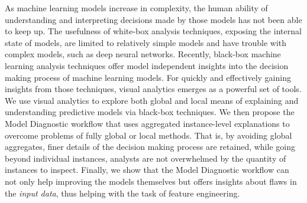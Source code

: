 As machine learning models increase in complexity, the human ability of understanding and interpreting decisions made by those models has not been able to keep up.
The usefulness of white-box analysis techniques, exposing the internal state of models, are limited to relatively simple models and have trouble with complex models, such as deep neural networks.
Recently, black-box machine learning analysis techniques offer model independent insights into the decision making process of machine learning models.
For quickly and effectively gaining insights from those techniques, visual analytics emerges as a powerful set of tools.
We use visual analytics to explore both global and local means of explaining and understanding predictive models via black-box techniques.
We then propose the Model Diagnostic workflow that uses aggregated instance-level explanations to overcome problems of fully global or local methods.
That is, by avoiding global aggregates, finer details of the decision making process are retained, while going beyond individual instances, analysts are not overwhelmed by the quantity of instances to inspect.
Finally, we show that the Model Diagnostic workflow can not only help improving the models themselves but offers insights about flaws in the \emph{input data}, thus helping with the task of feature engineering.



